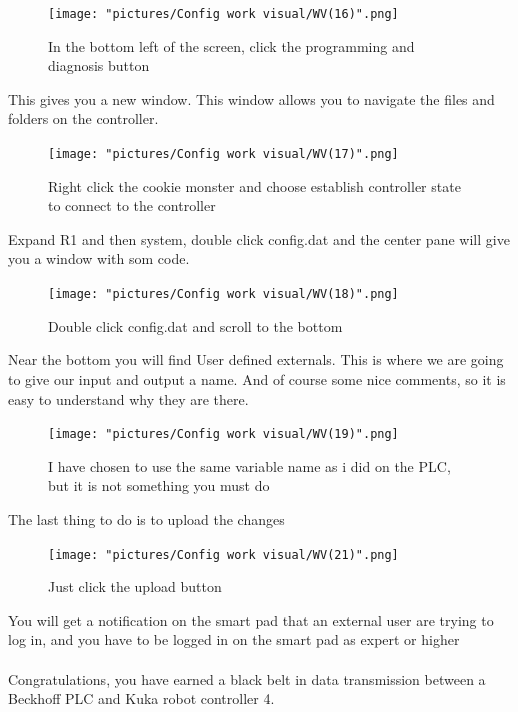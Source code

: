 \documentclass{article}
\begin{document}
\begin{figure}[!h]
    \centering
    \texttt{[image: "pictures/Config work visual/WV(16)".png]}
    \caption{In the bottom left of the screen, click the programming and diagnosis button}
    
\end{figure}

\newpage

This gives you a new window. This window allows you to navigate the files and folders on the controller. 

\begin{figure}[!h]
    \centering
    \texttt{[image: "pictures/Config work visual/WV(17)".png]}
    \caption{Right click the cookie monster and choose establish controller state to connect to the controller}
   
\end{figure}

\newpage

Expand R1 and then system, double click config.dat and the center pane will give you a window with som code.

\begin{figure}[!h]
    \centering
    \texttt{[image: "pictures/Config work visual/WV(18)".png]}
    \caption{Double click config.dat and scroll to the bottom}
    
\end{figure}

Near the bottom you will find User defined externals. This is where we are going to give our input and output a name. And of course some nice comments, so it is easy to understand why they are there. 

\newpage

\begin{figure}[!h]
    \centering
    \texttt{[image: "pictures/Config work visual/WV(19)".png]}
    \caption{I have chosen to use the same variable name as i did on the PLC, but it is not something you must do}
    
\end{figure}

\newpage

The last thing to do is to upload the changes

\begin{figure}[!h]
    \centering
    \texttt{[image: "pictures/Config work visual/WV(21)".png]}
    \caption{Just click the upload button}
    
\end{figure}

You will get a notification on the smart pad that an external user are trying to log in, and you have to be logged in on the smart pad as expert or higher
\\\\
Congratulations, you have earned a black belt in data transmission between a Beckhoff PLC and Kuka robot controller 4.  
\end{document}
